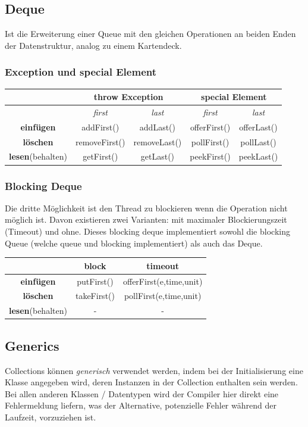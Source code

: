 \documentclass[12pt,a4]{article}
\begin{document}
	\subsection{Deque}
	Ist die Erweiterung einer Queue mit den gleichen Operationen an beiden Enden der Datenstruktur, analog zu einem Kartendeck.
	
	\subsubsection{Exception und special Element}
	
\begin{tabular}{|c|c|c|c|c|}
	\hline 
	&\multicolumn{2}{|c|}{\textbf{throw Exception}}&\multicolumn{2}{|c|}{\textbf{special Element}} \\
	\hline 
	&\textit{first}&\textit{last}&\textit{first}&\textit{last}  \\ 
	\hline 
	\textbf{einfügen}&addFirst()&addLast()&offerFirst()&offerLast()\\ 
	\hline 
	\textbf{löschen}&  removeFirst()&removeLast()&pollFirst()&pollLast()\\ 
	\hline 
	\textbf{lesen}(behalten)&getFirst()&getLast()&peekFirst()&peekLast()\\ 
	\hline 
\end{tabular} 

	\subsubsection{Blocking Deque}
	Die dritte Möglichkeit ist den Thread zu blockieren wenn die Operation nicht möglich ist. Davon existieren zwei Varianten: mit maximaler Blockierungszeit (Timeout) und ohne. Dieses blocking deque implementiert sowohl die blocking Queue (welche queue und blocking implementiert) als auch das Deque.
	\begin{center}
	\begin{tabular}{|c|c|c|}
		\hline 
		&\textbf{block}&\textbf{timeout}\\ 
		\hline 
		\textbf{einfügen}&putFirst()&offerFirst(e,time,unit)\\ 
		\hline 
		\textbf{löschen}&takeFirst()&pollFirst(e,time,unit)\\ 
		\hline 
		\textbf{lesen}(behalten)&-&-  \\ 
		\hline 
	\end{tabular} 
	\end{center}
	\subsection{Generics}
	Collections können \textit{generisch} verwendet werden, indem bei der Initialisierung eine Klasse angegeben wird, deren Instanzen in der Collection enthalten sein werden. Bei allen anderen Klassen / Datentypen wird der Compiler hier direkt eine Fehlermeldung liefern, was der Alternative, potenzielle Fehler während der Laufzeit, vorzuziehen ist.
\end{document}
